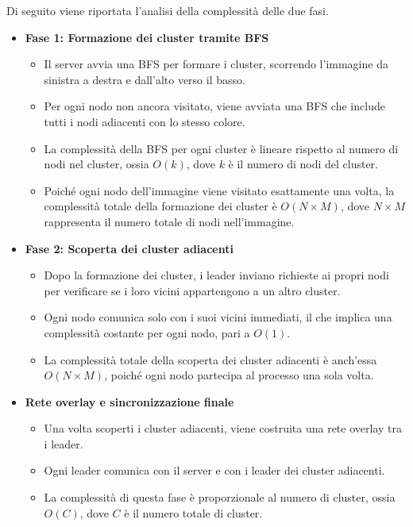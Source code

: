 \documentclass[12pt, a4paper]{report}
\begin{document}
Di seguito viene riportata l'analisi della complessit\`a delle due fasi.

\begin{itemize}
    \item \textbf{Fase 1: Formazione dei cluster tramite BFS}
    \begin{itemize}
        \item Il server avvia una BFS per formare i cluster, scorrendo l'immagine da sinistra a destra e dall'alto verso il basso.
        \item Per ogni nodo non ancora visitato, viene avviata una BFS che include tutti i nodi adiacenti con lo stesso colore.
        \item La complessit\`a della BFS per ogni cluster \`e lineare rispetto al numero di nodi nel cluster, ossia $O(k)$, dove $k$ \`e il numero di nodi del cluster.
        \item Poiché ogni nodo dell'immagine viene visitato esattamente una volta, la complessit\`a totale della formazione dei cluster \`e $O(N \times M)$, dove $N \times M$ rappresenta il numero totale di nodi nell'immagine.
    \end{itemize}

    \item \textbf{Fase 2: Scoperta dei cluster adiacenti}
    \begin{itemize}
        \item Dopo la formazione dei cluster, i leader inviano richieste ai propri nodi per verificare se i loro vicini appartengono a un altro cluster.
        \item Ogni nodo comunica solo con i suoi vicini immediati, il che implica una complessit\`a costante per ogni nodo, pari a $O(1)$.
        \item La complessit\`a totale della scoperta dei cluster adiacenti \`e anch'essa $O(N \times M)$, poiché ogni nodo partecipa al processo una sola volta.
    \end{itemize}
    \newpage
    \item \textbf{Rete overlay e sincronizzazione finale}
    \begin{itemize}
        \item Una volta scoperti i cluster adiacenti, viene costruita una rete overlay tra i leader.
        \item Ogni leader comunica con il server e con i leader dei cluster adiacenti.
        \item La complessit\`a di questa fase \`e proporzionale al numero di cluster, ossia $O(C)$, dove $C$ \`e il numero totale di cluster.
    \end{itemize}


\end{itemize}
\end{document}
